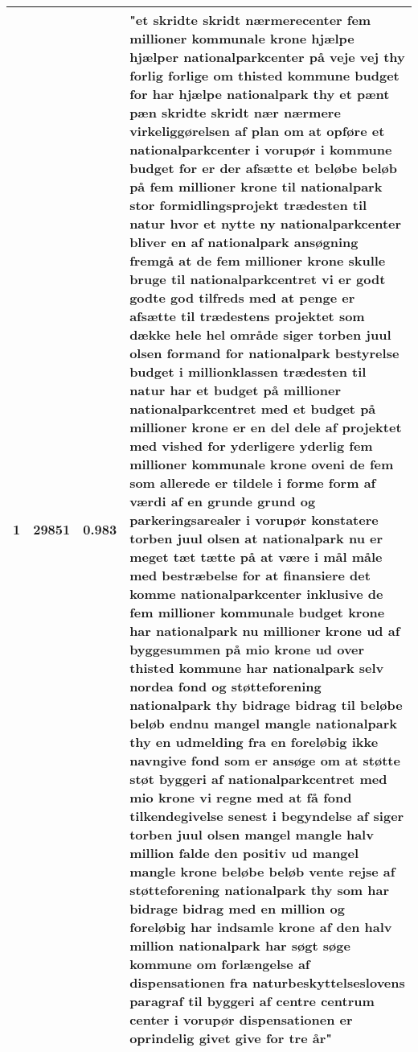 \begin{xltabular}{\linewidth}{@{}c|c|c|X@{}}
		1 & 29851 & 0.983 & "et skridte skridt nærmerecenter fem millioner kommunale krone hjælpe hjælper nationalparkcenter på veje vej thy forlig forlige om thisted kommune budget for har hjælpe nationalpark thy et pænt pæn skridte skridt nær nærmere virkeliggørelsen af plan om at opføre et nationalparkcenter i vorupør i kommune budget for er der afsætte et beløbe beløb på fem millioner krone til nationalpark stor formidlingsprojekt trædesten til natur hvor et nytte ny nationalparkcenter bliver en af nationalpark ansøgning fremgå at de fem millioner krone skulle bruge til nationalparkcentret vi er godt godte god tilfreds med at penge er afsætte til trædestens projektet som dække hele hel område siger torben juul olsen formand for nationalpark bestyrelse budget i millionklassen trædesten til natur har et budget på millioner nationalparkcentret med et budget på millioner krone er en del dele af projektet med vished for yderligere yderlig fem millioner kommunale krone oveni de fem som allerede er tildele i forme form af værdi af en grunde grund og parkeringsarealer i vorupør konstatere torben juul olsen at nationalpark nu er meget tæt tætte på at være i mål måle med bestræbelse for at finansiere det komme nationalparkcenter inklusive de fem millioner kommunale budget krone har nationalpark nu millioner krone ud af byggesummen på mio krone ud over thisted kommune har nationalpark selv nordea fond og støtteforening nationalpark thy bidrage bidrag til beløbe beløb endnu mangel mangle nationalpark thy en udmelding fra en foreløbig ikke navngive fond som er ansøge om at støtte støt byggeri af nationalparkcentret med mio krone vi regne med at få fond tilkendegivelse senest i begyndelse af siger torben juul olsen mangel mangle halv million falde den positiv ud mangel mangle krone beløbe beløb vente rejse af støtteforening nationalpark thy som har bidrage bidrag med en million og foreløbig har indsamle krone af den halv million nationalpark har søgt søge kommune om forlængelse af dispensationen fra naturbeskyttelseslovens paragraf til byggeri af centre centrum center i vorupør dispensationen er oprindelig givet give for tre år" \\
		\midrule

\end{xltabular}
